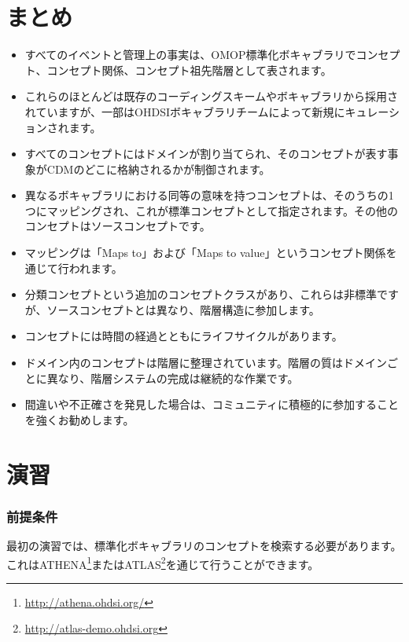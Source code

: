 \documentclass[
  11pt]{book}
\makeatletter
\providecommand{\tightlist}{%
  \setlength{\itemsep}{0pt}\setlength{\parskip}{0pt}}
\newenvironment{kframe}{%
\medskip{}
\setlength{\fboxsep}{.8em}
 \def\at@end@of@kframe{}%
 \ifinner\ifhmode%
  \def\at@end@of@kframe{\end{minipage}}%
  \begin{minipage}{\columnwidth}%
 \fi\fi%
 \def\FrameCommand##1{\hskip\@totalleftmargin \hskip-\fboxsep
 \colorbox{myShadeColor}{##1}\hskip-\fboxsep
     \hskip-\linewidth \hskip-\@totalleftmargin \hskip\columnwidth}%
 \MakeFramed {\advance\hsize-\width
   \@totalleftmargin\z@ \linewidth\hsize
   \@setminipage}}%
 {\par\unskip\endMakeFramed%
 \at@end@of@kframe}
\newenvironment{rmdblock}[1]
  {
  \begin{itemize}
  \renewcommand{\labelitemi}{
    \raisebox{-.7\height}[0pt][0pt]{
      {\setkeys{Gin}{width=3em,keepaspectratio}\texttt{[image: images/\#1]}}
    }
  }
  \setlength{\fboxsep}{1em}
  \begin{kframe}
  \item
  }
  {
  \end{kframe}
  \end{itemize}
  }
\newenvironment{rmdsummary}
  {\begin{rmdblock}{summary}}
  {\end{rmdblock}}
\theoremstyle{definition}
\theoremstyle{definition}
\theoremstyle{definition}
\theoremstyle{definition}
\theoremstyle{remark}
\makeatother
\begin{document}
\section{まとめ}\label{ux307eux3068ux3081-3}

\begin{rmdsummary}
\begin{itemize}
\tightlist
\item
  すべてのイベントと管理上の事実は、OMOP標準化ボキャブラリでコンセプト、コンセプト関係、コンセプト祖先階層として表されます。
\item
  これらのほとんどは既存のコーディングスキームやボキャブラリから採用されていますが、一部はOHDSIボキャブラリチームによって新規にキュレーションされます。
\item
  すべてのコンセプトにはドメインが割り当てられ、そのコンセプトが表す事象がCDMのどこに格納されるかが制御されます。
\item
  異なるボキャブラリにおける同等の意味を持つコンセプトは、そのうちの1つにマッピングされ、これが標準コンセプトとして指定されます。その他のコンセプトはソースコンセプトです。
\item
  マッピングは「Maps to」および「Maps to value」というコンセプト関係を通じて行われます。
\item
  分類コンセプトという追加のコンセプトクラスがあり、これらは非標準ですが、ソースコンセプトとは異なり、階層構造に参加します。
\item
  コンセプトには時間の経過とともにライフサイクルがあります。
\item
  ドメイン内のコンセプトは階層に整理されています。階層の質はドメインごとに異なり、階層システムの完成は継続的な作業です。
\item
  間違いや不正確さを発見した場合は、コミュニティに積極的に参加することを強くお勧めします。
\end{itemize}
\end{rmdsummary}

\section{演習}\label{ux6f14ux7fd2-1}

\subsubsection*{前提条件}\label{ux524dux63d0ux6761ux4ef6-2}

最初の演習では、標準化ボキャブラリのコンセプトを検索する必要があります。これはATHENA\footnote{\url{http://athena.ohdsi.org/}}またはATLAS\footnote{\url{http://atlas-demo.ohdsi.org}}を通じて行うことができます。
\end{document}
